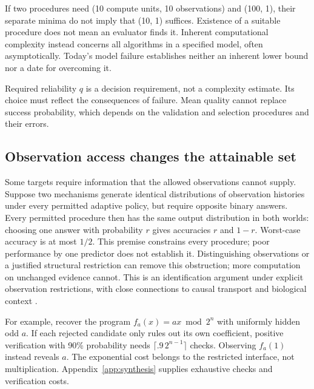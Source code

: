 If two procedures need (10 compute units, 10 observations) and (100, 1), their separate minima do not imply that (10, 1) suffices. Existence of a suitable procedure does not mean an evaluator finds it. Inherent computational complexity instead concerns all algorithms in a specified model, often asymptotically. Today's model failure establishes neither an inherent lower bound nor a date for overcoming it.

Required reliability $q$ is a decision requirement, not a complexity estimate. Its choice must reflect the consequences of failure. Mean quality cannot replace success probability, which depends on the validation and selection procedures and their errors.

\subsection{Observation access changes the attainable set}
Some targets require information that the allowed observations cannot supply. Suppose two mechanisms generate identical distributions of observation histories under every permitted adaptive policy, but require opposite binary answers. Every permitted procedure then has the same output distribution in both worlds: choosing one answer with probability $r$ gives accuracies $r$ and $1-r$. Worst-case accuracy is at most $1/2$. This premise constrains every procedure; poor performance by one predictor does not establish it. Distinguishing observations or a justified structural restriction can remove this obstruction; more computation on unchanged evidence cannot. This is an identification argument under explicit observation restrictions, with close connections to causal transport and biological context \citep{bareinboim2016,dibaeinia2026,mccormick2026}.

For example, recover the program $f_a(x)=ax\bmod 2^n$ with uniformly hidden odd $a$. If each rejected candidate only rules out its own coefficient, positive verification with 90\% probability needs $\lceil.9\,2^{n-1}\rceil$ checks. Observing $f_a(1)$ instead reveals $a$. The exponential cost belongs to the restricted interface, not multiplication. Appendix~\ref{app:synthesis} supplies exhaustive checks and verification costs.

